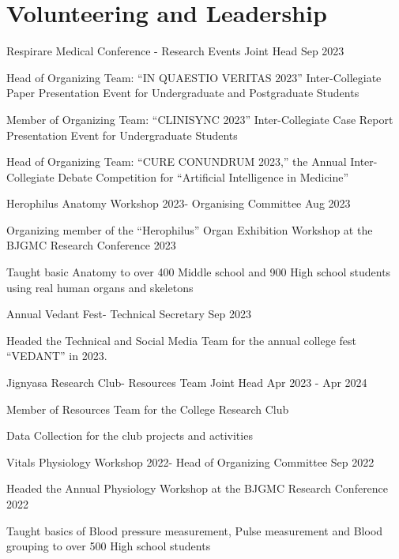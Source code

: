 \section{Volunteering and Leadership}
\resumeSubHeadingListStart

\resumeProject
{Respirare Medical Conference - Research Events Joint Head}
{}
{Sep 2023} 

\resumeItemListStart
    \item[$\bullet$]{Head of Organizing Team: “IN QUAESTIO VERITAS 2023” Inter-Collegiate Paper Presentation Event for Undergraduate and Postgraduate Students}
	\item[$\bullet$]{Member of Organizing Team: “CLINISYNC 2023” Inter-Collegiate Case Report Presentation Event for Undergraduate Students}
	\item[$\bullet$]{Head of Organizing Team: “CURE CONUNDRUM 2023,” the Annual Inter-Collegiate Debate Competition for “Artificial Intelligence in Medicine”}
\resumeItemListEnd

\resumeProject
{Herophilus Anatomy Workshop 2023- Organising Committee}
{}
{Aug 2023} 

\resumeItemListStart
    \item[$\bullet$]{Organizing member of the “Herophilus” Organ Exhibition Workshop at the BJGMC Research Conference 2023}
	\item[$\bullet$]{Taught basic Anatomy to over 400 Middle school and 900 High school students using real human organs and skeletons}
\resumeItemListEnd

\resumeProject
{Annual Vedant Fest- Technical Secretary}
{}
{Sep 2023} 

\resumeItemListStart
    \item[$\bullet$]{Headed the Technical and Social Media Team for the annual college fest “VEDANT”  in 2023.}
\resumeItemListEnd

\resumeProject
{Jignyasa Research Club- Resources Team Joint Head}
{}
{Apr 2023 - Apr 2024} 

\resumeItemListStart
    \item[$\bullet$]{Member of Resources Team for the College Research Club}
    \item[$\bullet$]{Data Collection for the club projects and activities} 
\resumeItemListEnd

\resumeProject
{Vitals Physiology Workshop 2022- Head of Organizing Committee}
{}
{Sep 2022} 

\resumeItemListStart
    \item[$\bullet$]{Headed the Annual Physiology Workshop at the BJGMC Research Conference 2022}
	\item[$\bullet$]{Taught basics of Blood pressure measurement, Pulse measurement and Blood grouping to over 500 High school students}
\resumeItemListEnd

\resumeSubHeadingListEnd

\vspace{-5.5mm}


